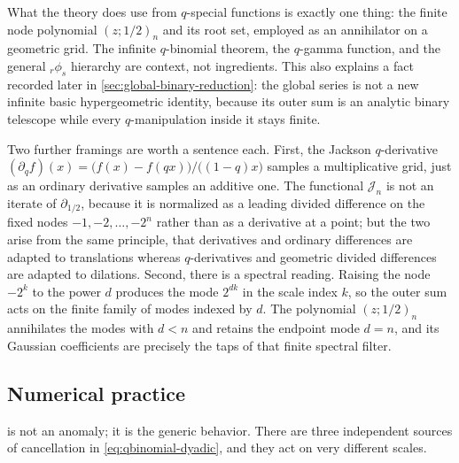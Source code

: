\documentclass[11pt,oneside]{article}
\theoremstyle{definition}
\theoremstyle{remark}
\begin{document}
What the theory does use from $q$-special functions is exactly one thing: the finite node
polynomial $(z;1/2)_n$ and its root set, employed as an annihilator on a geometric grid.  The
infinite $q$-binomial theorem, the $q$-gamma function, and the general ${}_r\phi_s$ hierarchy
are context, not ingredients.  This also explains a fact recorded later in
\cref{sec:global-binary-reduction}: the global series is not a new infinite basic
hypergeometric identity, because its outer sum is an analytic binary telescope while every
$q$-manipulation inside it stays finite.

Two further framings are worth a sentence each.  First, the Jackson $q$-derivative
$(\partial_qf)(x)=\bigl(f(x)-f(qx)\bigr)/\bigl((1-q)x\bigr)$ samples a multiplicative grid,
just as an ordinary derivative samples an additive one.  The functional $\mathcal J_n$ is not
an iterate of $\partial_{1/2}$, because it is normalized as a leading divided difference on
the fixed nodes $-1,-2,\ldots,-2^n$ rather than as a derivative at a point; but the two arise
from the same principle, that derivatives and ordinary differences are adapted to
translations whereas $q$-derivatives and geometric divided differences are adapted to
dilations.  Second, there is a spectral reading.  Raising the node $-2^k$ to the power $d$
produces the mode $2^{dk}$ in the scale index $k$, so the outer sum acts on the finite family
of modes indexed by $d$.  The polynomial $(z;1/2)_n$ annihilates the modes with $d<n$ and
retains the endpoint mode $d=n$, and its Gaussian coefficients are precisely the taps of that
finite spectral filter.

\subsection{Numerical practice}
\label{subsec:qs-numerics}

 is not an anomaly; it is the generic behavior.  There are three independent
sources of cancellation in \eqref{eq:qbinomial-dyadic}, and they act on very different scales.
\end{document}
